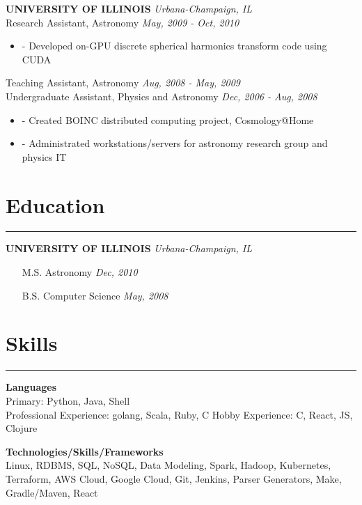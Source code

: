 \documentclass[a4paper,11pt]{article}
\newenvironment{pitemize}{
\begin{itemize}
\setlength{\itemsep}{.01in}
\setlength{\parskip}{.01in}
}
{\end{itemize}}
\begin{document}
\vspace{0.2in}
\textbf{UNIVERSITY OF ILLINOIS} \hfill \textit{Urbana-Champaign, IL} \\
Research Assistant, Astronomy \hfill \textit{May, 2009 - Oct, 2010}
\begin{pitemize}
\item[-]Developed on-GPU discrete spherical harmonics transform code using CUDA
\end{pitemize}
Teaching Assistant, Astronomy \hfill \textit{Aug, 2008 - May, 2009} \\
Undergraduate Assistant, Physics and Astronomy \hfill \textit{Dec, 2006 - Aug, 2008}
\begin{pitemize}
\item[-]Created BOINC distributed computing project, Cosmology@Home
\item[-]Administrated workstations/servers for astronomy research group and physics IT
\end{pitemize}


\section*{\huge{Education}}
\hrule
\vspace{0.1in}
\textbf{UNIVERSITY OF ILLINOIS} \hfill \textit{Urbana-Champaign, IL}
\begin{itemize}
\setlength{\itemsep}{0.0in}
\item[]M.S. Astronomy \hfill \textit{Dec, 2010}
\item[]B.S. Computer Science \hfill \textit{May, 2008}
\end{itemize}

\section*{\huge{Skills}}
\hrule
\vspace{0.1in}
\textbf{Languages} \\
Primary: Python, Java, Shell \\
Professional Experience: golang, Scala, Ruby, C
Hobby Experience: C, React, JS, Clojure

\vspace{0.1in}

\textbf{Technologies/Skills/Frameworks} \\
Linux, RDBMS, SQL, NoSQL, Data Modeling, Spark, Hadoop, Kubernetes, Terraform, AWS Cloud, Google Cloud, Git, Jenkins, Parser Generators, Make, Gradle/Maven, React
\end{document}
